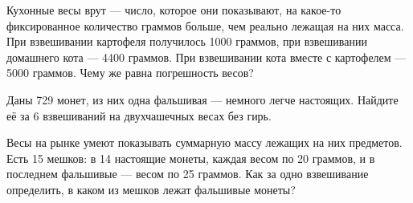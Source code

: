 ﻿

\begin{enumerate}
\itA Кухонные весы врут — число, которое они показывают, на какое-то фиксированное количество граммов больше, чем реально лежащая на них масса. При взвешивании картофеля получилось 1000 граммов, при взвешивании домашнего кота — 4400 граммов. При взвешивании кота вместе с картофелем — 5000 граммов. Чему же равна погрешность весов?

\itB Даны 729 монет, из них одна фальшивая — немного легче настоящих. Найдите её за 6 взвешиваний на двухчашечных весах без гирь.

\itC Весы на рынке умеют показывать суммарную массу лежащих на них предметов. Есть 15 мешков: в 14 настоящие монеты, каждая весом по 20 граммов, и в последнем фальшивые — весом по 25 граммов. Как за одно взвешивание определить, в каком из мешков лежат фальшивые монеты?
\end{enumerate}